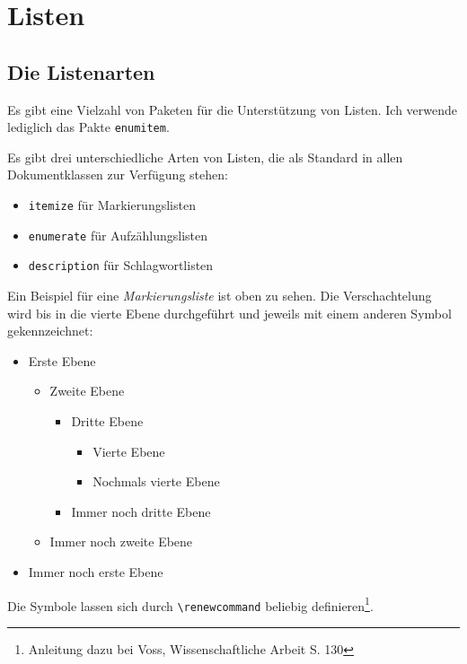 \chapter{Listen}
\section{Die Listenarten}
Es gibt eine Vielzahl von Paketen für die Unterstützung von Listen. Ich verwende lediglich das Pakte \verb*+enumitem+.

Es gibt drei unterschiedliche Arten von Listen, die als Standard in allen Dokumentklassen zur Verfügung stehen:
\begin{itemize}
	\item \verb*+itemize+ für Markierungslisten
	\item \verb*+enumerate+ für Aufzählungslisten
	\item \verb*+description+ für Schlagwortlisten	
\end{itemize}

Ein Beispiel für eine \emph{Markierungsliste} ist oben zu sehen. Die Verschachtelung wird bis in die vierte Ebene durchgeführt und jeweils mit einem anderen Symbol gekennzeichnet:
\begin{itemize}
	\item Erste Ebene
	\begin{itemize}
		\item Zweite Ebene
		\begin{itemize}
			\item Dritte Ebene
			\begin{itemize}
				\item Vierte Ebene
				\item Nochmals vierte Ebene
			\end{itemize}
			\item Immer noch dritte Ebene
		\end{itemize}
		\item Immer noch zweite Ebene
	\end{itemize}
	\item Immer noch erste Ebene
\end{itemize}

Die Symbole lassen sich durch \verb*+\renewcommand+ beliebig definieren\footnote{Anleitung dazu bei Voss, Wissenschaftliche Arbeit S. 130}.

